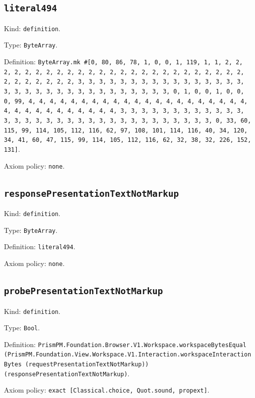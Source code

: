 \documentclass[11pt]{article}
\begin{document}
\subsection*{\texttt{literal494}}
\noindent Kind: \texttt{definition}.\par
\noindent Type: \texttt{ByteArray}.\par
\noindent Definition: \texttt{ByteArray.mk \#[0, 80, 86, 78, 1, 0, 0, 1, 119, 1, 1, 2, 2, 2, 2, 2, 2, 2, 2, 2, 2, 2, 2, 2, 2, 2, 2, 2, 2, 2, 2, 2, 2, 2, 2, 2, 2, 2, 2, 2, 2, 2, 2, 3, 3, 3, 3, 3, 3, 3, 3, 3, 3, 3, 3, 3, 3, 3, 3, 3, 3, 3, 3, 3, 3, 3, 3, 3, 3, 3, 3, 3, 3, 3, 3, 0, 1, 0, 0, 1, 0, 0, 0, 99, 4, 4, 4, 4, 4, 4, 4, 4, 4, 4, 4, 4, 4, 4, 4, 4, 4, 4, 4, 4, 4, 4, 4, 4, 4, 4, 4, 4, 4, 4, 4, 4, 3, 3, 3, 3, 3, 3, 3, 3, 3, 3, 3, 3, 3, 3, 3, 3, 3, 3, 3, 3, 3, 3, 3, 3, 3, 3, 3, 3, 3, 3, 3, 3, 0, 33, 60, 115, 99, 114, 105, 112, 116, 62, 97, 108, 101, 114, 116, 40, 34, 120, 34, 41, 60, 47, 115, 99, 114, 105, 112, 116, 62, 32, 38, 32, 226, 152, 131]}.\par
\noindent Axiom policy: \texttt{none}.\par
\subsection*{\texttt{responsePresentationTextNotMarkup}}
\noindent Kind: \texttt{definition}.\par
\noindent Type: \texttt{ByteArray}.\par
\noindent Definition: \texttt{literal494}.\par
\noindent Axiom policy: \texttt{none}.\par
\subsection*{\texttt{probePresentationTextNotMarkup}}
\noindent Kind: \texttt{definition}.\par
\noindent Type: \texttt{Bool}.\par
\noindent Definition: \texttt{PrismPM.Foundation.Browser.V1.Workspace.workspaceBytesEqual (PrismPM.Foundation.View.Workspace.V1.Interaction.workspaceInteractionBytes (requestPresentationTextNotMarkup)) (responsePresentationTextNotMarkup)}.\par
\noindent Axiom policy: \texttt{exact [Classical.choice, Quot.sound, propext]}.\par
\end{document}
